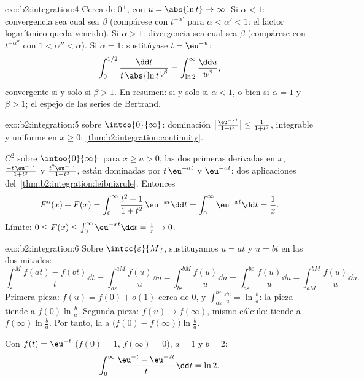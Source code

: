 \begin{solution}{exo:b2:integration:4}
Cerca de $0^+$, con $u = \abs{\ln t} \to \infty$. Si $\alpha < 1$:
convergencia sea cual sea $\beta$ (compárese con $t^{-\alpha'}$ para
$\alpha < \alpha' < 1$: el factor logarítmico queda vencido). Si
$\alpha > 1$: divergencia sea cual sea $\beta$ (compárese con
$t^{-\alpha''}$ con $1 < \alpha'' < \alpha$). Si $\alpha = 1$:
sustitúyase $t = \eu^{-u}$:
\[
\int_0^{1/2} \frac{\dd t}{t\,\abs{\ln t}^\beta}
= \int_{\ln 2}^{\infty} \frac{\dd u}{u^\beta},
\]
convergente si y solo si $\beta > 1$. En resumen:  si y solo
si $\alpha < 1$, o bien si $\alpha = 1$ y $\beta > 1$; el espejo de
las series de Bertrand.
\end{solution}

\begin{solution}{exo:b2:integration:5}
 sobre $\intco{0}{\infty}$: dominación
$\bigl|\frac{\eu^{-xt}}{1+t^2}\bigr| \leq \frac{1}{1+t^2}$,
integrable y uniforme en $x \geq 0$:
\cref{thm:b2:integration:continuity}.

$C^2$ sobre $\intoo{0}{\infty}$: para $x \geq a > 0$, las dos
primeras derivadas en $x$, $\frac{-t\,\eu^{-xt}}{1+t^2}$ y
$\frac{t^2\eu^{-xt}}{1+t^2}$, están dominadas por $t\,\eu^{-at}$ y
$\eu^{-at}$: dos aplicaciones del~\cref{thm:b2:integration:leibnizrule}. Entonces
\[
F''(x) + F(x) = \int_0^\infty \frac{t^2 + 1}{1 + t^2}\,\eu^{-xt}\dd
t = \int_0^\infty \eu^{-xt}\dd t = \frac1x .
\]
Límite: $0 \leq F(x) \leq \int_0^\infty \eu^{-xt}\dd t = \frac1x \to
0$.
\end{solution}

\begin{solution}{exo:b2:integration:6}
Sobre $\intcc{\varepsilon}{M}$, sustituyamos $u = at$ y $u = bt$ en
las dos mitades:
\[
\int_\varepsilon^M \frac{f(at) - f(bt)}{t}\dd t
= \int_{a\varepsilon}^{aM}\frac{f(u)}{u}\dd u
- \int_{b\varepsilon}^{bM}\frac{f(u)}{u}\dd u
= \int_{a\varepsilon}^{b\varepsilon} \frac{f(u)}{u}\dd u
- \int_{aM}^{bM} \frac{f(u)}{u}\dd u .
\]
Primera pieza: $f(u) = f(0) + o(1)$ cerca de $0$, y
$\int_{a\varepsilon}^{b\varepsilon} \frac{\dd u}{u} = \ln\frac ba$:
la pieza tiende a $f(0)\ln\frac ba$. Segunda pieza: $f(u) \to
f(\infty)$, mismo cálculo: tiende a $f(\infty)\ln\frac ba$. Por
tanto, la   a $\bigl(f(0) -
f(\infty)\bigr)\ln\frac ba$.

Con $f(t) = \eu^{-t}$ ($f(0) = 1$, $f(\infty) = 0$), $a = 1$ y $b =
2$:
\[
\int_0^\infty \frac{\eu^{-t} - \eu^{-2t}}{t}\dd t = \ln 2 .
\]
\end{solution}

